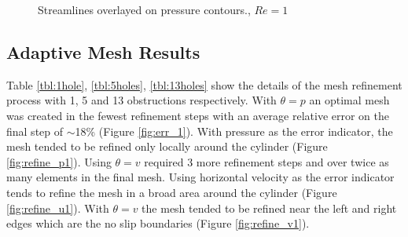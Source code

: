 \documentclass[wrr]{agutex}  %
\begin{document}
\begin{article}
\begin{figure}
\caption{Streamlines overlayed on pressure contours., $Re=1$}\label{fig:solution}
\end{figure}

\subsection{Adaptive Mesh Results}
Table \ref{tbl:1hole}, \ref{tbl:5holes}, \ref{tbl:13holes} show the details of the mesh refinement process with 1, 5 and 13 obstructions respectively.  With $\theta=p$ an optimal mesh was created in the fewest refinement steps with an average relative error on the final step of $\sim$18\% (Figure \ref{fig:err_1}).  With pressure as the error indicator, the mesh tended to be refined only locally around the cylinder (Figure \ref{fig:refine_p1}).  Using $\theta=v$ required 3 more refinement steps and over twice as many elements in the final mesh.  Using horizontal velocity as the error indicator tends to refine the mesh in a broad area around the cylinder (Figure \ref{fig:refine_u1}).  With $\theta=v$ the mesh tended to be refined near the left and right edges which are the no slip boundaries (Figure \ref{fig:refine_v1}).  


\end{article}
\end{document}
